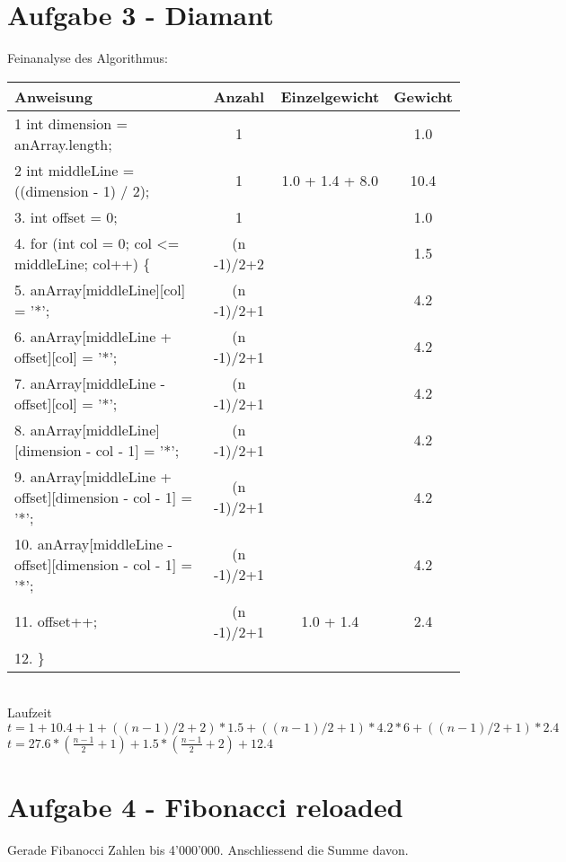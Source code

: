 \section*{Aufgabe 3 - Diamant}


Feinanalyse des Algorithmus:

\begin{tabular}{l | c | c | c |}
Anweisung & Anzahl & Einzelgewicht & Gewicht \\
\hline
1	int dimension = anArray.length;	&	1	&	& 	1.0		\\
2	int middleLine = ((dimension - 1) / 2);	&	1	&	1.0 + 1.4 + 8.0	& 	10.4	\\
3.	int offset = 0;	&	1	&	& 	1.0	\\
4.	for (int col = 0; col <= middleLine; col++) \{	&	(n -1)/2+2	& 	&  1.5		\\
5.	anArray[middleLine][col] = '*';	&	(n -1)/2+1	&	& 	4.2	\\
6.	anArray[middleLine + offset][col] = '*';	&	(n -1)/2+1	&	& 	4.2	\\
7.	anArray[middleLine - offset][col] = '*';	&	(n -1)/2+1	&	& 	4.2	\\
8.	anArray[middleLine][dimension - col - 1] = '*';	&	(n -1)/2+1	&	& 	4.2	\\
9.	anArray[middleLine + offset][dimension - col - 1] = '*';	&	(n -1)/2+1	&	& 	4.2	\\
10.	anArray[middleLine - offset][dimension - col - 1] = '*';	&	(n -1)/2+1	&	& 	4.2	\\
11.	offset++;	&		(n -1)/2+1		&	1.0 + 1.4	& 	2.4	\\
12.	\}
\end{tabular}\\
Laufzeit $t = 1 + 10.4 + 1 + ((n-1)/2 + 2)*1.5 + ((n-1)/2 + 1)*4.2*6 + ((n-1)/2 + 1)*2.4$\\
$t = 27.6*(\frac{n-1}{2} + 1) + 1.5*(\frac{n-1}{2} + 2) + 12.4 $\\

\section*{Aufgabe 4 - Fibonacci reloaded}
Gerade Fibanocci Zahlen bis 4'000'000.
Anschliessend die Summe davon.

